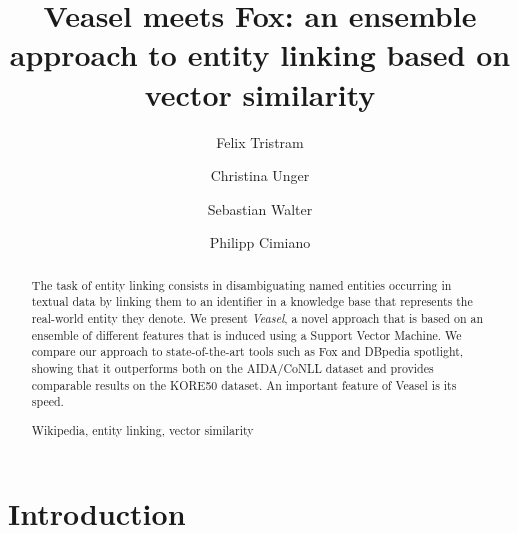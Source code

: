 \documentclass[runningheads,a4paper]{llncs}
\newcommand{\keywords}[1]{\par\addvspace\baselineskip
\noindent\keywordname\enspace\ignorespaces#1}
\begin{document}
\mainmatter  %

\newcommand{\acronym}{Veasel}



\title{Veasel meets Fox: an ensemble approach to entity linking based on vector similarity }

\author{Felix Tristram \and Christina Unger \and Sebastian Walter \and Philipp Cimiano}



\maketitle


\begin{abstract}
The task of entity linking consists in disambiguating named entities occurring in textual data by linking them to an identifier in a knowledge base that represents the real-world entity they denote. We present \emph{Veasel}, a novel approach that is based on an ensemble of different features that is induced using a Support Vector Machine. We compare our approach to state-of-the-art tools such as Fox and DBpedia spotlight, showing that it outperforms both on the AIDA/CoNLL dataset and provides comparable results on the KORE50 dataset. An important feature of Veasel is its speed.

\keywords{Wikipedia, entity linking, vector similarity}
\end{abstract}

\section{Introduction}\label{sec:introduction}
\end{document}
